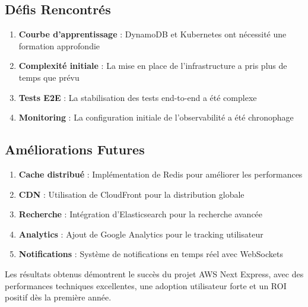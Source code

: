 \subsection{Défis Rencontrés}

\begin{enumerate}
    \item \textbf{Courbe d'apprentissage} : DynamoDB et Kubernetes ont nécessité une formation approfondie
    \item \textbf{Complexité initiale} : La mise en place de l'infrastructure a pris plus de temps que prévu
    \item \textbf{Tests E2E} : La stabilisation des tests end-to-end a été complexe
    \item \textbf{Monitoring} : La configuration initiale de l'observabilité a été chronophage
\end{enumerate}

\subsection{Améliorations Futures}

\begin{enumerate}
    \item \textbf{Cache distribué} : Implémentation de Redis pour améliorer les performances
    \item \textbf{CDN} : Utilisation de CloudFront pour la distribution globale
    \item \textbf{Recherche} : Intégration d'Elasticsearch pour la recherche avancée
    \item \textbf{Analytics} : Ajout de Google Analytics pour le tracking utilisateur
    \item \textbf{Notifications} : Système de notifications en temps réel avec WebSockets
\end{enumerate}

Les résultats obtenus démontrent le succès du projet AWS Next Express, avec des performances techniques excellentes, une adoption utilisateur forte et un ROI positif dès la première année. 